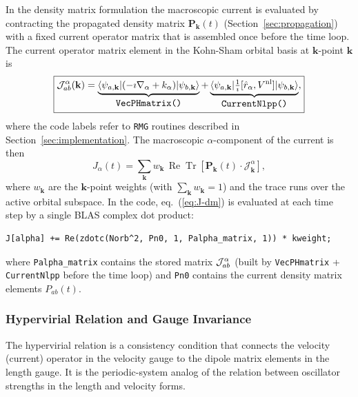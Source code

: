 In the density matrix formulation the macroscopic current is
evaluated by contracting the propagated density matrix
$\mathbf{P}_\mathbf{k}(t)$ (Section~\ref{sec:propagation}) with
a fixed current operator matrix that is assembled once before the
time loop.
The current operator matrix element in the Kohn-Sham orbital basis
at $\mathbf{k}$-point $\mathbf{k}$ is
\begin{equation}
  \boxed{
  \mathcal{J}^{\alpha}_{ab}(\mathbf{k})
  = \underbrace{
      \langle\psi_{a,\mathbf{k}}|
      (-\imath\nabla_\alpha + k_\alpha)
      |\psi_{b,\mathbf{k}}\rangle
    }_{\displaystyle\texttt{VecPHmatrix()}}
  +
  \underbrace{
      \langle\psi_{a,\mathbf{k}}|
      \tfrac{1}{\imath}[\hat{r}_\alpha,V^{\mathrm{nl}}]
      |\psi_{b,\mathbf{k}}\rangle
    }_{\displaystyle\texttt{CurrentNlpp()}},
  }
  \label{eq:Jmat-full}
\end{equation}
where the code labels refer to \texttt{RMG} routines described in
Section~\ref{sec:implementation}.
The macroscopic $\alpha$-component of the current is then
\begin{equation}
  J_\alpha(t)
  = \sum_{\mathbf{k}} w_\mathbf{k}\,
    \operatorname{Re}\operatorname{Tr}\!\left[
      \mathbf{P}_\mathbf{k}(t)\cdot
      \boldsymbol{\mathcal{J}}^\alpha_\mathbf{k}
    \right],
  \label{eq:J-dm}
\end{equation}
where $w_\mathbf{k}$ are the $\mathbf{k}$-point weights
(with $\sum_\mathbf{k} w_\mathbf{k} = 1$) and the trace runs over
the active orbital subspace.
In the code, eq.~(\ref{eq:J-dm}) is evaluated at each time step by
a single BLAS complex dot product:
\begin{verbatim}
J[alpha] += Re(zdotc(Norb^2, Pn0, 1, Palpha_matrix, 1)) * kweight;
\end{verbatim}
where \texttt{Palpha\_matrix} contains the stored matrix
$\mathcal{J}^{\alpha}_{ab}$ (built by \texttt{VecPHmatrix} +
\texttt{CurrentNlpp} before the time loop) and \texttt{Pn0}
contains the current density matrix elements $P_{ab}(t)$.

\subsubsection{Hypervirial Relation and Gauge Invariance}
\label{sec:hypervirial}

The hypervirial relation is a consistency condition that connects the
velocity (current) operator in the velocity gauge to the dipole
matrix elements in the length gauge.
It is the periodic-system analog of the relation between oscillator
strengths in the length and velocity forms.

